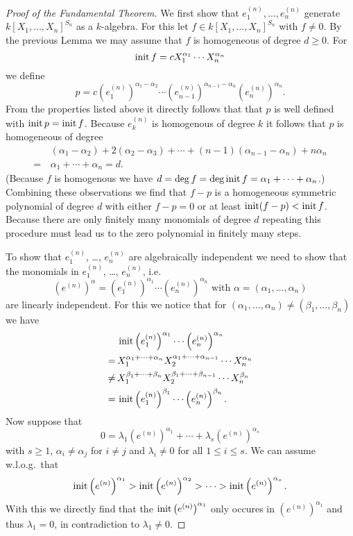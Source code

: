 \begin{proof}[Proof of the Fundamental Theorem]
 We first show that $e^{(n)}_1, \dotsc, e^{(n)}_n$ generate $k[X_1, \dotsc, X_n]^{S_n}$ as a $k$-algebra. For this let $f \in k[X_1, \dotsc, X_n]^{S_n}$ with $f \neq 0$. By the previous Lemma we may assume that $f$ is homogeneous of degree $d \geq 0$. For
 \[
  \operatorname{init} f = c X_1^{\alpha_1} \dotsm X_n^{\alpha_n}
 \]
 we define
 \[
  p = c \left(e^{(n)}_1\right)^{\alpha_1 - \alpha_2} \dotsm \left(e^{(n)}_{n-1}\right)^{\alpha_{n-1} - \alpha_n} \left(e^{(n)}_n\right)^{\alpha_n}.
 \]
 From the properties listed above it directly follows that that $p$ is well defined with $\operatorname{init} p = \operatorname{init} f$. Because $e^{(n)}_k$ is homogenous of degree $k$ it follows that $p$ is homogeneous of degree
 \begin{align*}
   &\,(\alpha_1-\alpha_2) + 2(\alpha_2-\alpha_3) + \dotsb + (n-1)(\alpha_{n-1}-\alpha_n)+n\alpha_n \\
  =&\, \alpha_1 + \dotsb + \alpha_n
  = d.
 \end{align*}
 (Because $f$ is homogenous we have $d = \deg f = \deg \operatorname{init} f = \alpha_1 + \dotsb + \alpha_n$.) Combining these observations we find that $f-p$ is a homogeneous symmetric polynomial of degree $d$ with either $f-p = 0$ or at least $\operatorname{init} (f-p) < \operatorname{init} f$. Because there are only finitely many monomials of degree $d$ repeating this procedure must lead us to the zero polynomial in finitely many steps.
 
 To show that $e^{(n)}_1$, \dots, $e^{(n)}_n$ are algebraically independent we need to show that the monomials in $e^{(n)}_1$, \dots, $e^{(n)}_n$, i.e.
 \[
  \left(e^{(n)}\right)^\alpha = \left(e^{(n)}_1\right)^{\alpha_1} \dotsm \left(e^{(n)}_n\right)^{\alpha_n} \text{ with } \alpha = (\alpha_1, \dotsc, \alpha_n)
 \]
 are linearly independent. For this we notice that for $(\alpha_1, \dotsc, \alpha_n) \neq (\beta_1, \dotsc, \beta_n)$ we have
 \begin{align*}
      &\, \operatorname{init} \left(e^{(n)}_1\right)^{\alpha_1} \dotsm \left(e^{(n)}_n\right)^{\alpha_n} \\
     =&\, X_1^{\alpha_1 + \dotsb + \alpha_n} X_2^{\alpha_1 + \dotsb + \alpha_{n-1}} \dotsm X_n^{\alpha_n} \\
  \neq&\, X_1^{\beta_1 + \dotsb + \beta_n} X_2^{\beta_1 + \dotsb + \beta_{n-1}} \dotsm X_n^{\beta_n} \\
     =&\, \operatorname{init} \left(e^{(n)}_1\right)^{\beta_1} \dotsm \left(e^{(n)}_n\right)^{\beta_n}.
 \end{align*}
 Now suppose that
 \[
  0 = \lambda_1 \left(e^{(n)}\right)^{\alpha_1} + \dotsb + \lambda_s \left(e^{(n)}\right)^{\alpha_s}
 \]
 with $s \geq 1$, $\alpha_i \neq \alpha_j$ for $i \neq j$ and $\lambda_i \neq 0$ for all $1 \leq i \leq s$. We can assume w.l.o.g.\ that 
 \[
  \operatorname{init} \left(e^{(n)}\right)^{\alpha_1} > \operatorname{init} \left(e^{(n)}\right)^{\alpha_2} > \dotsb > \operatorname{init} \left(e^{(n)}\right)^{\alpha_s}.
 \]
 With this we directly find that the $\operatorname{init} \left(e^{(n)}\right)^{\alpha_1}$ only occures in $\left(e^{(n)}\right)^{\alpha_1}$ and thus $\lambda_1 = 0$, in contradiction to $\lambda_1 \neq 0$.
\end{proof}


